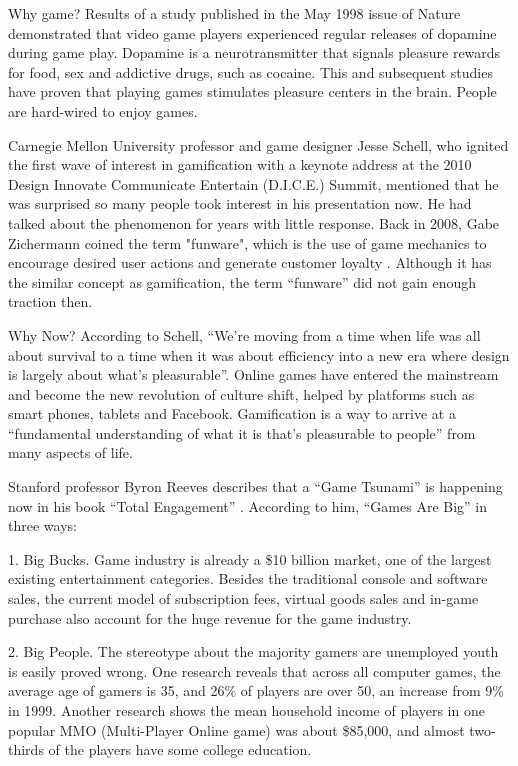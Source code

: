 Why game? Results of a study published in the May 1998 issue of Nature \cite {koepp1998evidence} demonstrated that video game players experienced regular releases of dopamine during game play. Dopamine is a
neurotransmitter that signals pleasure rewards for food, sex and addictive drugs, such as cocaine. This and subsequent studies have proven that playing games stimulates pleasure centers in the brain. People are hard-wired to enjoy games.

Carnegie Mellon University professor and game designer Jesse Schell, who ignited the first wave of interest in gamification with a keynote address at the 2010 Design Innovate Communicate Entertain (D.I.C.E.) Summit, mentioned that he was surprised so many people took interest in his presentation now. He had talked about the phenomenon for years with little response. Back in 2008, Gabe Zichermann coined the term "funware", which is the use of game mechanics to encourage desired user actions and generate customer loyalty \cite {WikipediaFunware}. Although it has the similar concept as gamification, the term ``funware'' did not gain enough traction then.

Why Now? According to Schell, ``We're moving from a time when life was all about survival to a time when it was about efficiency into a new era where design is largely about what's pleasurable''. Online games have entered the mainstream and become the new revolution of culture shift, helped by platforms such as smart phones, tablets and Facebook. Gamification is a way to arrive at a ``fundamental understanding of what it is that's pleasurable to people'' from many aspects of life. 

Stanford professor Byron Reeves describes that a ``Game Tsunami'' is happening now in his book ``Total Engagement'' \cite{reeves2009total}. According to him, ``Games Are Big'' in three ways: 

1. Big Bucks. Game industry is already a \$10 billion market, one of the largest existing entertainment categories.  Besides the traditional console and software sales, the current model of subscription fees, virtual goods sales and in-game purchase also account for the huge revenue for the game industry.

2. Big People. The stereotype about the majority gamers are unemployed youth is easily proved wrong. One research reveals that across all computer games, the average age of gamers is 35, and 26\% of players are over 50, an increase from 9\% in 1999. Another research shows the mean household income of players in one popular MMO (Multi-Player Online game) was about \$85,000, and almost two-thirds of the players have some college education.

